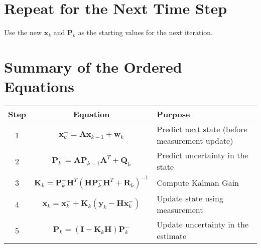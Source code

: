 \documentclass{article}
\begin{document}
\section{Repeat for the Next Time Step}
Use the new $\mathbf{x}_k$ and $\mathbf{P}_k$ as the starting values for the next iteration.

\section{Summary of the Ordered Equations}

\begin{center}
\begin{tabular}{|c|c|l|}
\hline
Step & Equation & Purpose \\
\hline
1 & $\mathbf{x}_k^- = \mathbf{A} \mathbf{x}_{k-1} + \mathbf{w}_k$ & Predict next state (before measurement update) \\
\hline
2 & $\mathbf{P}_k^- = \mathbf{A} \mathbf{P}_{k-1} \mathbf{A}^T + \mathbf{Q}_k$ & Predict uncertainty in the state \\
\hline
3 & $\mathbf{K}_k = \mathbf{P}_k^- \mathbf{H}^T (\mathbf{H} \mathbf{P}_k^- \mathbf{H}^T + \mathbf{R}_k)^{-1}$ & Compute Kalman Gain \\
\hline
4 & $\mathbf{x}_k = \mathbf{x}_k^- + \mathbf{K}_k (\mathbf{y}_k - \mathbf{H} \mathbf{x}_k^-)$ & Update state using measurement \\
\hline
5 & $\mathbf{P}_k = (\mathbf{I} - \mathbf{K}_k \mathbf{H}) \mathbf{P}_k^-$ & Update uncertainty in the estimate \\
\hline
\end{tabular}
\end{center}
\end{document}
